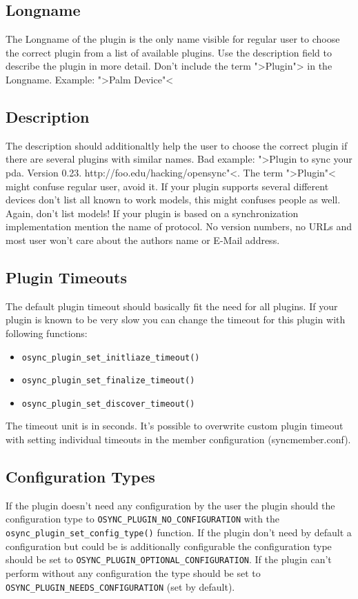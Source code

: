\subsection{Longname}
The Longname of the plugin is the only name visible for  regular user to choose 
the correct plugin from a list of available plugins. Use the description field
to describe the plugin in more detail. Don't include the term ">Plugin"> in the
Longname. Example: ">Palm Device"<
\subsection{Description}
The description should additionaltly help the user to choose the correct plugin
if there are several plugins with similar names. Bad example: ">Plugin to sync 
your pda. Version 0.23. http://foo.edu/hacking/opensync"<. The term ">Plugin"< 
might confuse regular user, avoid it. If your plugin supports several different
devices don't list all known to work models, this might confuses people as well.
Again, don't list models! If your plugin is based on a synchronization 
implementation mention the name of protocol. No version numbers, no URLs and 
most user won't care about the authors name or E-Mail address.
\subsection{Plugin Timeouts}
The default plugin timeout should basically fit the need for all plugins. If
your plugin is known to be very slow you can change the timeout for this plugin
with following functions:
\begin{itemize}
\item \verb|osync_plugin_set_initliaze_timeout()|
\item \verb|osync_plugin_set_finalize_timeout()|
\item \verb|osync_plugin_set_discover_timeout()|
\end{itemize}
The timeout unit is in seconds. It's possible to overwrite custom plugin timeout
with setting individual timeouts in the member configuration (syncmember.conf).
\subsection{Configuration Types}
If the plugin doesn't need any configuration by the user the plugin should the
configuration type to \verb|OSYNC_PLUGIN_NO_CONFIGURATION| with the
\verb|osync_plugin_set_config_type()| function. If the plugin don't need by
default a configuration but could be is additionally configurable the
configuration type should be set to \verb|OSYNC_PLUGIN_OPTIONAL_CONFIGURATION|. 
If the plugin can't perform without any configuration the type should be set
to\\ \verb|OSYNC_PLUGIN_NEEDS_CONFIGURATION| (set by default).

